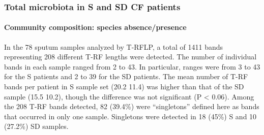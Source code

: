 \subsubsection{Total microbiota in S and SD CF patients}
\paragraph{Community composition: species absence/presence} In the 78 sputum samples analyzed by T-RFLP, a total of 1411 bands representing 208 different T-RF lengths were detected. The number of individual bands in each sample ranged from 2 to 43. In particular, ranges were from 3 to 43 for the S patients and 2 to 39 for the SD patients. The mean number of T-RF bands per patient in S sample set (20.2 {\textpm} 11.4) was higher than that of the SD sample (15.5 {\textpm} 10.2), though the difference was not significant (P {\textless} 0.06). Among the 208 T-RF bands detected, 82 (39.4\%) were ``singletons'' defined here as bands that occurred in only one sample. Singletons were detected in 18 (45\%) S and 10 (27.2\%) SD samples.\\
